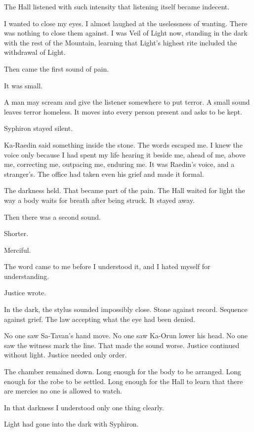 The Hall listened with such intensity that listening itself became indecent.\par
I wanted to close my eyes.
I almost laughed at the uselessness of wanting.
There was nothing to close them against.
I was Veil of Light now, standing in the dark with the rest of the Mountain, learning that Light's highest rite included the withdrawal of Light.\par
Then came the first sound of pain.\par
It was small.\par
A man may scream and give the listener somewhere to put terror.
A small sound leaves terror homeless.
It moves into every person present and asks to be kept.\par
Syphiron stayed silent.\par
Ka-Raedin said something inside the stone.
The words escaped me.
I knew the voice only because I had spent my life hearing it beside me, ahead of me, above me, correcting me, outpacing me, enduring me.
It was Raedin's voice, and a stranger's.
The office had taken even his grief and made it formal.\par
The darkness held.
That became part of the pain.
The Hall waited for light the way a body waits for breath after being struck.
It stayed away.\par
Then there was a second sound.\par
Shorter.\par
Merciful.\par
The word came to me before I understood it, and I hated myself for understanding.\par
Justice wrote.\par
In the dark, the stylus sounded impossibly close.
Stone against record.
Sequence against grief.
The law accepting what the eye had been denied.\par
No one saw Sa-Tavan's hand move.
No one saw Ka-Orun lower his head.
No one saw the witness mark the line.
That made the sound worse.
Justice continued without light.
Justice needed only order.\par
The chamber remained down.
Long enough for the body to be arranged.
Long enough for the robe to be settled.
Long enough for the Hall to learn that there are mercies no one is allowed to watch.\par
In that darkness I understood only one thing clearly.\par
Light had gone into the dark with Syphiron.\par

